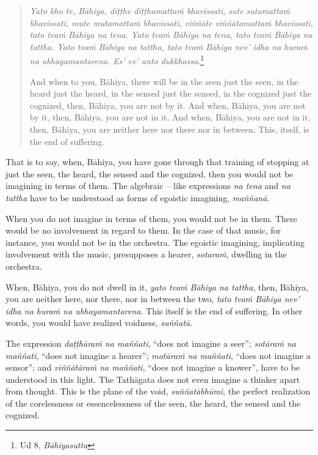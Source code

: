 \begin{quote}
\emph{Yato kho te, Bāhiya, diṭṭhe diṭṭhamattaṁ bhavissati, sute sutamattaṁ bhavissati, mute mutamattaṁ bhavissati, viññāte viññātamattaṁ bhavissati, tato tvaṁ Bāhiya na tena. Yato tvaṁ Bāhiya na tena, tato tvaṁ Bāhiya na tattha. Yato tvaṁ Bāhiya na tattha, tato tvaṁ Bāhiya nev' idha na huraṁ na ubhayamantarena. Es' ev' anto dukkhassa}.\footnote{Ud 8, \emph{Bāhiyasutta}}

And when to you, Bāhiya, there will be in the seen just the seen, in the heard just the heard, in the sensed just the sensed, in the cognized just the cognized, then, Bāhiya, you are not by it. And when, Bāhiya, you are not by it, then, Bāhiya, you are not in it. And when, Bāhiya, you are not in it, then, Bāhiya, you are neither here nor there nor in between. This, itself, is the end of suffering.
\end{quote}

That is to say, when, Bāhiya, you have gone through that training of stopping at just the seen, the heard, the sensed and the cognized, then you would not be imagining in terms of them. The algebraic -- like expressions \emph{na tena} and \emph{na tattha} have to be understood as forms of egoistic imagining, \emph{maññanā}.

When you do not imagine in terms of them, you would not be in them. There would be no involvement in regard to them. In the case of that music, for instance, you would not be in the orchestra. The egoistic imagining, implicating involvement with the music, presupposes a hearer, \emph{sotaraṁ}, dwelling in the orchestra.

When, Bāhiya, you do not dwell in it, \emph{yato tvaṁ Bāhiya na tattha}, then, Bāhiya, you are neither here, nor there, nor in between the two, \emph{tato tvaṁ Bāhiya nev' idha na huraṁ na ubhayamantarena}. This itself is the end of suffering. In other words, you would have realized voidness, \emph{suññatā}.

The expression \emph{daṭṭhāraṁ na maññati}, ``does not imagine a seer''; \emph{sotāraṁ na maññati}, ``does not imagine a hearer''; \emph{motāraṁ na maññati}, ``does not imagine a sensor''; and \emph{viññātāraṁ na maññati}, ``does not imagine a knower'', have to be understood in this light. The Tathāgata does not even imagine a thinker apart from thought. This is the plane of the void, \emph{suññatābhūmi}, the perfect realization of the corelessness or essencelessness of the seen, the heard, the sensed and the cognized.

